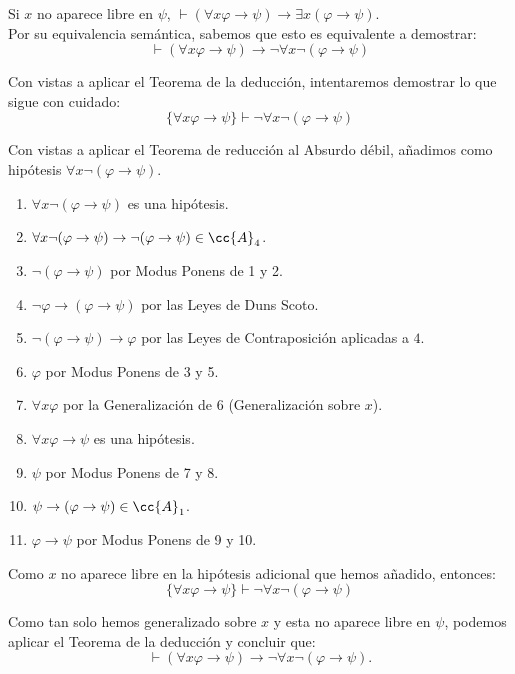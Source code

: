 \begin{ejercicio}\label{ej:2.11}
    Si $x$ no aparece libre en $\psi$, $\vdash (\forall x \varphi \rightarrow \psi) \rightarrow \exists x(\varphi \rightarrow \psi)$.\\

    Por su equivalencia semántica, sabemos que esto es equivalente a demostrar:
    \begin{equation*}
        \vdash (\forall x \varphi \rightarrow \psi) \rightarrow \neg\forall x \neg(\varphi \rightarrow \psi)
    \end{equation*}

    Con vistas a aplicar el Teorema de la deducción, intentaremos demostrar lo que sigue con cuidado:
    \begin{equation*}
        \{\forall x \varphi \rightarrow \psi\} \vdash \neg\forall x \neg(\varphi \rightarrow \psi)
    \end{equation*}

    Con vistas a aplicar el Teorema de reducción al Absurdo débil, añadimos como hipótesis $\forall x \neg(\varphi \rightarrow \psi)$.
    \begin{enumerate}
        \item $\forall x \neg(\varphi \rightarrow \psi)$ es una hipótesis.
        \item $\forall x \neg(\varphi \rightarrow \psi)\rightarrow \neg(\varphi \rightarrow \psi)\in \cc{A}_4$.
        \item $\neg(\varphi \rightarrow \psi)$ por Modus Ponens de 1 y 2.
        \item $\neg \varphi\rightarrow (\varphi \rightarrow \psi)$ por las Leyes de Duns Scoto.
        \item $\neg(\varphi \rightarrow \psi)\rightarrow \varphi$ por las Leyes de Contraposición aplicadas a $4$.
        \item $\varphi$ por Modus Ponens de 3 y 5.
        \item $\forall x \varphi$ por la Generalización de 6 \qquad (Generalización sobre $x$).
        \item $\forall x \varphi \rightarrow \psi$ es una hipótesis.
        \item $\psi$ por Modus Ponens de 7 y 8.
        \item $\psi\to (\varphi\to \psi)\in\cc{A}_1$.
        \item $\varphi\to \psi$ por Modus Ponens de 9 y 10. 
    \end{enumerate}

    Como $x$ no aparece libre en la hipótesis adicional que hemos añadido, entonces:
    \begin{equation*}
        \{\forall x \varphi \rightarrow \psi\} \vdash \neg\forall x \neg(\varphi \rightarrow \psi)
    \end{equation*}

    Como tan solo hemos generalizado sobre $x$ y esta no aparece libre en $\psi$, podemos aplicar el Teorema de la deducción y concluir que:
    \begin{equation*}
        \vdash (\forall x \varphi \rightarrow \psi) \rightarrow \neg\forall x \neg(\varphi \rightarrow \psi).
    \end{equation*}
\end{ejercicio}